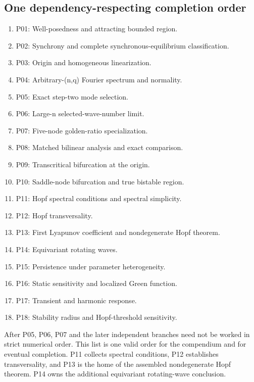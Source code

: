 \subsection{One dependency-respecting completion order}
\begin{enumerate}
\item P01: Well-posedness and attracting bounded region.
\item P02: Synchrony and complete synchronous-equilibrium classification.
\item P03: Origin and homogeneous linearization.
\item P04: Arbitrary-(n,q) Fourier spectrum and normality.
\item P05: Exact step-two mode selection.
\item P06: Large-n selected-wave-number limit.
\item P07: Five-node golden-ratio specialization.
\item P08: Matched bilinear analysis and exact comparison.
\item P09: Transcritical bifurcation at the origin.
\item P10: Saddle-node bifurcation and true bistable region.
\item P11: Hopf spectral conditions and spectral simplicity.
\item P12: Hopf transversality.
\item P13: First Lyapunov coefficient and nondegenerate Hopf theorem.
\item P14: Equivariant rotating waves.
\item P15: Persistence under parameter heterogeneity.
\item P16: Static sensitivity and localized Green function.
\item P17: Transient and harmonic response.
\item P18: Stability radius and Hopf-threshold sensitivity.
\end{enumerate}
After P05, P06, P07 and the later independent branches need not be worked in
strict numerical order. This list is one valid order for the compendium and
for eventual completion. P11 collects spectral conditions, P12 establishes
transversality, and P13 is the home of the assembled nondegenerate Hopf theorem.
P14 owns the additional equivariant rotating-wave conclusion.

